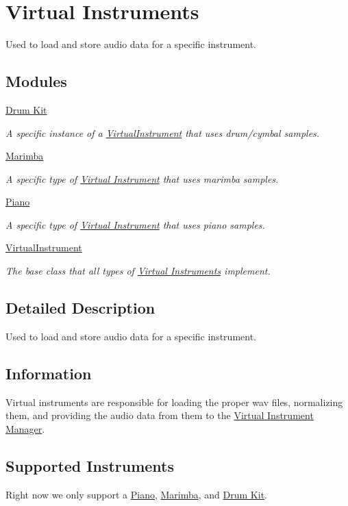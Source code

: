 \hypertarget{group___v_i}{}\section{Virtual Instruments}
\label{group___v_i}


Used to load and store audio data for a specific instrument.  


\subsection*{Modules}
\begin{DoxyCompactItemize}
\item 
\hyperlink{group___doc_drum}{Drum Kit}
\begin{DoxyCompactList}\small\item\em A specific instance of a \hyperlink{class_virtual_instrument}{Virtual\+Instrument} that uses drum/cymbal samples. \end{DoxyCompactList}\item 
\hyperlink{group___doc_mar}{Marimba}
\begin{DoxyCompactList}\small\item\em A specific type of \hyperlink{group___v_i}{Virtual Instrument} that uses marimba samples. \end{DoxyCompactList}\item 
\hyperlink{group___doc_piano}{Piano}
\begin{DoxyCompactList}\small\item\em A specific type of \hyperlink{group___v_i}{Virtual Instrument} that uses piano samples. \end{DoxyCompactList}\item 
\hyperlink{group___v_i_base}{Virtual\+Instrument}
\begin{DoxyCompactList}\small\item\em The base class that all types of \hyperlink{group___v_i}{Virtual Instruments} implement. \end{DoxyCompactList}\end{DoxyCompactItemize}


\subsection{Detailed Description}
Used to load and store audio data for a specific instrument. 

\hypertarget{group___v_i_VIInfo}{}\subsection{Information}\label{group___v_i_VIInfo}
Virtual instruments are responsible for loading the proper wav files, normalizing them, and providing the audio data from them to the \hyperlink{group___v_i_m}{Virtual Instrument Manager}.\hypertarget{group___v_i_VISuppInst}{}\subsection{Supported Instruments}\label{group___v_i_VISuppInst}
Right now we only support a \hyperlink{class_piano}{Piano}, \hyperlink{class_marimba}{Marimba}, and \hyperlink{class_drum_kit}{Drum Kit}. 